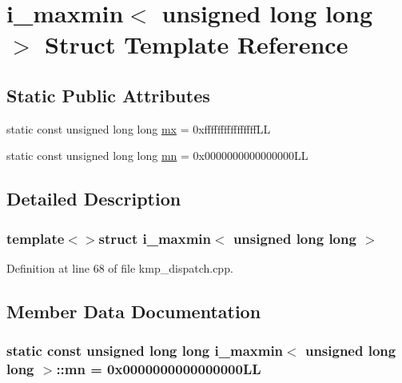 \hypertarget{structi__maxmin_3_01unsigned_01long_01long_01_4}{\section{i\-\_\-maxmin$<$ unsigned long long $>$ Struct Template Reference}
\label{structi__maxmin_3_01unsigned_01long_01long_01_4}
}
\subsection*{Static Public Attributes}
\begin{DoxyCompactItemize}
\item 
static const unsigned long long \hyperlink{structi__maxmin_3_01unsigned_01long_01long_01_4_a348b4c66fff0c3771110fa98d07e570f}{mx} = 0xffffffffffffffff\-L\-L
\item 
static const unsigned long long \hyperlink{structi__maxmin_3_01unsigned_01long_01long_01_4_abe70bb61cd756a70721203f1c952cc54}{mn} = 0x0000000000000000\-L\-L
\end{DoxyCompactItemize}


\subsection{Detailed Description}
\subsubsection*{template$<$$>$struct i\-\_\-maxmin$<$ unsigned long long $>$}



Definition at line 68 of file kmp\-\_\-dispatch.\-cpp.



\subsection{Member Data Documentation}
\hypertarget{structi__maxmin_3_01unsigned_01long_01long_01_4_abe70bb61cd756a70721203f1c952cc54}{
\subsubsection[{mn}]{\setlength{\rightskip}{0pt plus 5cm}static const unsigned long long {\bf i\-\_\-maxmin}$<$ unsigned long long $>$\-::mn = 0x0000000000000000\-L\-L\hspace{0.3cm}{\ttfamily [static]}}}\label{structi__maxmin_3_01unsigned_01long_01long_01_4_abe70bb61cd756a70721203f1c952cc54}


